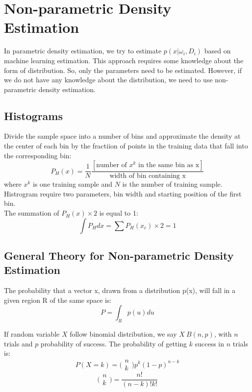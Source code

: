 \chapter{Non-parametric Density Estimation}

\begin{multicols*}{2}
\noindent In parametric density estimation, we try to estimate $p(x|\omega_i, D_i)$ based on machine learning estimation. This approach requires some knowledge about the form of distribution. So, only the parameters need to be estimated. However, if we do not have any knowledge about the distribution, we need to use non-parametric density estimation. 

\section{Histograms}

\noindent Divide the sample space into a number of bins and approximate the density at the center of each bin by the fractiion of points in the training data that fall into the corresponding bin:
$$P_H(x) = \frac{1}{N} \frac{[\text{number of } x^k \text{ in the same bin as x}]}{\text{width of bin containing x}}$$
\noindent where $x^k$ is one training sample and $N$ is the number of training sample. \\

\noindent Histrogram require two parameters, bin width and starting position of the first bin. \\

\noindent The summation of $P_H(x) \times 2$ is equal to 1:
$$\int P_H dx = \sum P_H(x_c) \times 2 = 1$$ 
\section{General Theory for Non-parametric Density Estimation}

\noindent The probability that a vector x, drawn from a distribution p(x), will fall in a given region R of the same space is:
$$P=\int_R p(u) du$$

\noindent If random variable $X$ follow binomial distribution, we say $X ~ B(n, p)$, with $n$ trials and $p$ probability of success. The probability of getting $k$ success in $n$ trials is:
$$P(X=k) = \bigg( \begin{matrix} n \\ k \end{matrix}\bigg) p^k (1-p)^{n-k}$$
$$\bigg( \begin{matrix} n \\ k \end{matrix}\bigg) = \frac{n!}{(n-k)!k!}$$


\end{multicols*}
